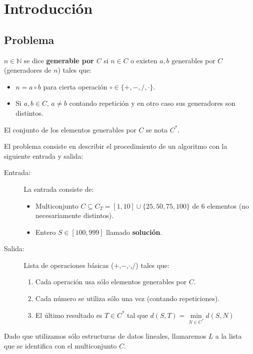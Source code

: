 \section{Introducción}
\subsection{Problema}

\begin{definition}
	$n \in \mathbb{N}$ se dice \textbf{generable por $C$} si $n \in C$ o
	existen $a,b$ generables por $C$ (generadores de $n$) tales que:
	\begin{itemize}
		\item $n = a \circ b$ para cierta operación $\circ \in \{+,-,/,\cdot \}$.
		\item Si $a,b \in C$, $a \neq b$ contando repetición y en otro caso sus
		generadores son distintos.
	\end{itemize}
	El conjunto de los elementos generables por $C$ se nota $C^{\ast}$.
\end{definition}

El problema consiste en describir el procedimiento de un algoritmo con la
siguiente entrada y salida:

\begin{description}
	\item[Entrada:] La entrada consiste de:
		\begin{itemize}
			\item Multiconjunto $C \subseteq C_T = [1,10] \cup \{ 25, 50, 75, 100\}$
			de 6 elementos (no necesariamente distintos).
			\item Entero $S \in [100, 999]$ llamado \textbf{solución}.
		\end{itemize}

	\item[Salida:] Lista de operaciones básicas ($+$,$-$,$\cdot$,$/$) tales que:
	\begin{enumerate}
		\item Cada operación usa sólo elementos generables por $C$.
		\item Cada número se utiliza sólo una vez (contando repeticiones).
		\item El último resultado es $T \in C^{\ast}$ tal que $d(S,T) = \underset{N \in C^{\ast}}{\min} d(S,N)$
	\end{enumerate}
\end{description}

Dado que utilizamos sólo estructuras de datos lineales, llamaremos $L$ a la lista
que se identifica con el multiconjunto $C$.

